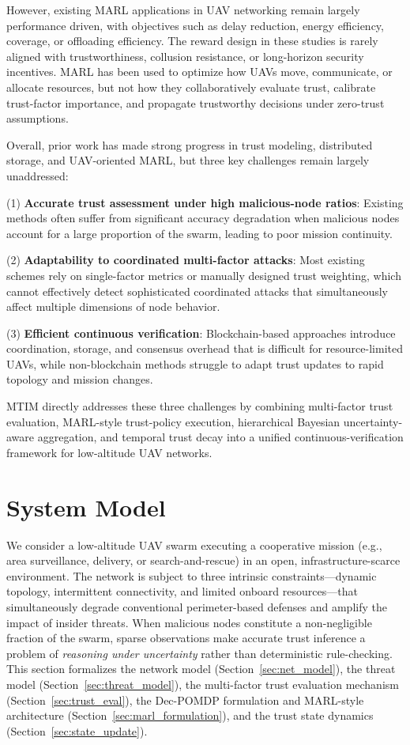 \documentclass[notspecified,article,submit,moreauthors]{Definitions/mdpi}
\begin{document}
However, existing MARL applications in UAV networking remain largely performance driven, with objectives such as delay reduction, energy efficiency, coverage, or offloading efficiency. The reward design in these studies is rarely aligned with trustworthiness, collusion resistance, or long-horizon security incentives. MARL has been used to optimize how UAVs move, communicate, or allocate resources, but not how they collaboratively evaluate trust, calibrate trust-factor importance, and propagate trustworthy decisions under zero-trust assumptions.

Overall, prior work has made strong progress in trust modeling, distributed storage, and UAV-oriented MARL, but three key challenges remain largely unaddressed:

(1) \textbf{Accurate trust assessment under high malicious-node ratios}: Existing methods often suffer from significant accuracy degradation when malicious nodes account for a large proportion of the swarm, leading to poor mission continuity.

(2) \textbf{Adaptability to coordinated multi-factor attacks}: Most existing schemes rely on single-factor metrics or manually designed trust weighting, which cannot effectively detect sophisticated coordinated attacks that simultaneously affect multiple dimensions of node behavior.

(3) \textbf{Efficient continuous verification}: Blockchain-based approaches introduce coordination, storage, and consensus overhead that is difficult for resource-limited UAVs, while non-blockchain methods struggle to adapt trust updates to rapid topology and mission changes.

MTIM directly addresses these three challenges by combining multi-factor trust evaluation, MARL-style trust-policy execution, hierarchical Bayesian uncertainty-aware aggregation, and temporal trust decay into a unified continuous-verification framework for low-altitude UAV networks.


\section{System Model}
\label{sec:system_model}

We consider a low-altitude UAV swarm executing a cooperative mission (e.g., area surveillance, delivery, or search-and-rescue) in an open, infrastructure-scarce environment. The network is subject to three intrinsic constraints---dynamic topology, intermittent connectivity, and limited onboard resources---that simultaneously degrade conventional perimeter-based defenses and amplify the impact of insider threats. When malicious nodes constitute a non-negligible fraction of the swarm, sparse observations make accurate trust inference a problem of \emph{reasoning under uncertainty} rather than deterministic rule-checking. This section formalizes the network model (Section~\ref{sec:net_model}), the threat model (Section~\ref{sec:threat_model}), the multi-factor trust evaluation mechanism (Section~\ref{sec:trust_eval}), the Dec-POMDP formulation and MARL-style architecture (Section~\ref{sec:marl_formulation}), and the trust state dynamics (Section~\ref{sec:state_update}).
\end{document}
